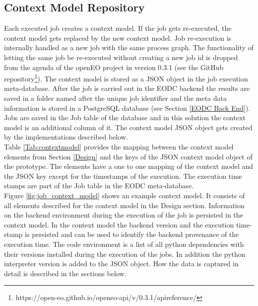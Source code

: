\documentclass[draft,final]{vutinfth} %
\begin{document}
\subsection{Context Model Repository}\label{Implementation:Provenance Repository}
Each executed job creates a context model. If the job gets re-executed, the context model gets replaced by the new context model. Job re-execution is internally handled as a new job with the same process graph. The functionality of letting the same job be re-executed without creating a new job id is dropped from the agenda of the openEO project in version 0.3.1 (see the GitHub repository\footnote{https://open-eo.github.io/openeo-api/v/0.3.1/apireference/}). 
The context model is stored as a JSON object in the job execution meta-database. After the job is carried out in the EODC backend the results are saved in a folder named after the unique job identifier and the meta data information is stored in a PostgreSQL database (see Section \ref{EODC Back End}). Jobs are saved in the Job table of the database and in this solution the context model is an additional column of it. The context model JSON object gets created by the implementations described below. \\
Table \ref{Tab:contextmodel} provides the mapping between the context model elements from Section \ref{Design} and the keys of the JSON context model object of the prototype. The elements have a one to one mapping of the context model and the JSON key except for the timestamps of the execution. The execution time stamps are part of the Job table in the EODC meta-database. \\
Figure \ref{fig:job_context_model} shows an example context model. It consists of all elements described for the context model in the Design section. Information on the backend environment during the execution of the job is persisted in the context model. In the context model the backend version and the execution time-stamp is persisted and can be used to identify the backend provenance of the execution time. The code environment is a list of all python dependencies with their versions installed during the execution of the jobs. In addition the python interpreter version is added to the JSON object. How the data is captured in detail is described in the sections below.    

 
\end{document}
